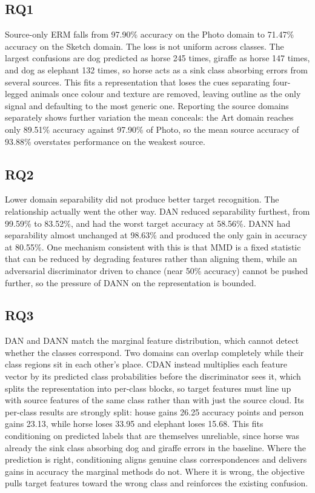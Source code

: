 \documentclass{article}
\begin{document}
\subsection{RQ1}

Source-only ERM falls from 97.90\% accuracy on the Photo domain to 71.47\%
accuracy on the Sketch domain. The loss is not uniform across classes. The
largest confusions are dog predicted as horse 245 times, giraffe as horse 147
times, and dog as elephant 132 times, so horse acts as a sink class absorbing
errors from several sources. This fits a representation that loses the cues
separating four-legged animals once colour and texture are removed, leaving
outline as the only signal and defaulting to the most generic one. Reporting
the source domains separately shows further variation the mean conceals: the
Art domain reaches only 89.51\% accuracy against 97.90\% of Photo, so the
mean source accuracy of 93.88\% overstates performance on the weakest source.

\subsection{RQ2}

Lower domain separability did not produce better target recognition. The
relationship actually went the other way. DAN reduced separability furthest,
from 99.59\% to 83.52\%, and had the worst target accuracy at 58.56\%. DANN
had separability almost unchanged at 98.63\% and produced the only gain in
accuracy at 80.55\%. One mechanism consistent with this is that MMD is a
fixed statistic that can be reduced by degrading features rather than
aligning them, while an adversarial discriminator driven to chance (near
50\% accuracy) cannot be pushed further, so the pressure of DANN on the
representation is bounded.

\subsection{RQ3}

DAN and DANN match the marginal feature distribution, which cannot detect
whether the classes correspond. Two domains can overlap completely while
their class regions sit in each other's place. CDAN instead multiplies each
feature vector by its predicted class probabilities before the discriminator
sees it, which splits the representation into per-class blocks, so target
features must line up with source features of the same class rather than with
just the source cloud. Its per-class results are strongly split: house gains
26.25 accuracy points and person gains 23.13, while horse loses 33.95 and
elephant loses 15.68. This fits conditioning on predicted labels that are
themselves unreliable, since horse was already the sink class absorbing dog
and giraffe errors in the baseline. Where the prediction is right,
conditioning aligns genuine class correspondences and delivers gains in
accuracy the marginal methods do not. Where it is wrong, the objective pulls
target features toward the wrong class and reinforces the existing confusion.
\end{document}
